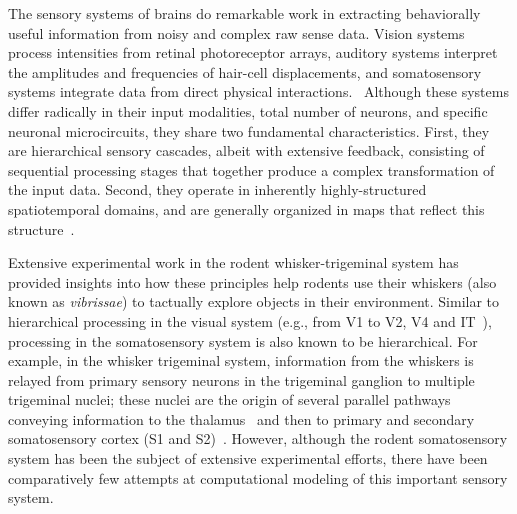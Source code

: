 The sensory systems of brains do remarkable work in extracting behaviorally useful information from noisy and complex raw sense data. 
Vision systems process intensities from retinal photoreceptor arrays, auditory systems interpret the amplitudes and frequencies of hair-cell displacements, and somatosensory systems integrate data from direct physical interactions.~\cite{purves2001neuroscience} 
Although these systems differ radically in their input modalities, total number of neurons, and specific neuronal microcircuits, they share two fundamental characteristics. 
First, they are hierarchical sensory cascades, albeit with extensive feedback, consisting of sequential processing stages that together produce a complex transformation of the input data.  
Second, they operate in inherently highly-structured spatiotemporal domains, and are generally organized in maps that reflect this structure~\cite{felleman1991distributed}.

Extensive experimental work in the rodent whisker-trigeminal system has provided insights into how these principles help rodents use their whiskers (also known as \emph{vibrissae}) to tactually explore objects in their environment.  
Similar to hierarchical processing in the visual system (e.g., from V1 to V2, V4 and IT~\cite{felleman1991distributed, Goodale1992}), processing in the somatosensory system is also known to be hierarchical\cite{Pons1987, Inui2004, Iwamura1998}.  
For example, in the whisker trigeminal system, information from the whiskers is relayed from primary sensory neurons in the trigeminal ganglion to multiple trigeminal nuclei; these nuclei are the origin of several parallel pathways conveying information to the thalamus~\cite{yu2006parallel, moore2015vibrissa} and then to primary and secondary somatosensory cortex (S1 and S2)~\cite{bosman2011anatomical}.  
However, although the rodent somatosensory system has been the subject of extensive experimental efforts\cite{armstrong1992flow, petersen2003spatiotemporal, kerr2007spatial, von2007neuronal}, there have been comparatively few attempts at computational modeling of this important sensory system. 

